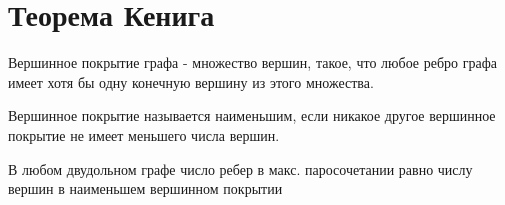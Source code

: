 \documentclass[discrete.tex]{subfiles}
\begin{document}
\section{Теорема Кенига}

\begin{definition}
    Вершинное покрытие графа - множество вершин, такое, что любое ребро графа
    имеет хотя бы одну конечную вершину из этого множества.
\end{definition}

\begin{definition}
    Вершинное покрытие называется наименьшим, если никакое другое вершинное покрытие не
    имеет меньшего числа вершин.
\end{definition}

\begin{theorem} [Кёнига]
    В любом двудольном графе число ребер в макс. паросочетании равно числу вершин в
    наименьшем вершинном покрытии
\end{theorem}
\end{document}
